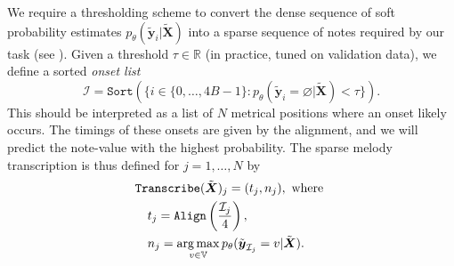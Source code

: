 We require a thresholding scheme to convert the dense sequence of soft probability estimates $p_\theta(\tilde{\bm{y}}_i|\tilde{\bm{X}})$ into a sparse sequence of notes required by our task (see ). Given a threshold $\tau\in\mathbb{R}$ (in practice, tuned on validation data), we define a sorted \emph{onset list}
\[
\mathcal{I} = \texttt{Sort}(\{i \in \{0,\dots,4B-1\} : p_\theta(\tilde{\bm{y}}_i = \varnothing|\tilde{\bm{X}}) < \tau\}).
\]
This should be interpreted as a list of $N$ metrical positions where an onset likely occurs. The timings of these onsets are given by the alignment, and we will predict the note-value with the highest probability. The sparse melody transcription is thus defined for $j=1,\dots,N$ by
\begin{align*}
&\texttt{Transcribe}(\tilde{\mbox{\boldmath{$X$}}})_j = (t_j,n_j),\text{ where }\\
&\quad t_j = \texttt{Align}\left(\frac{\mathcal{I}_j}{4}\right),\\
&\quad n_j = \operatorname*{arg\,max}_{v\in\mathbb{V}} p_\theta(\tilde{\mbox{\boldmath{$y$}}}_{\mathcal{I}_j} = v|\tilde{\mbox{\boldmath{$X$}}}).
\end{align*}